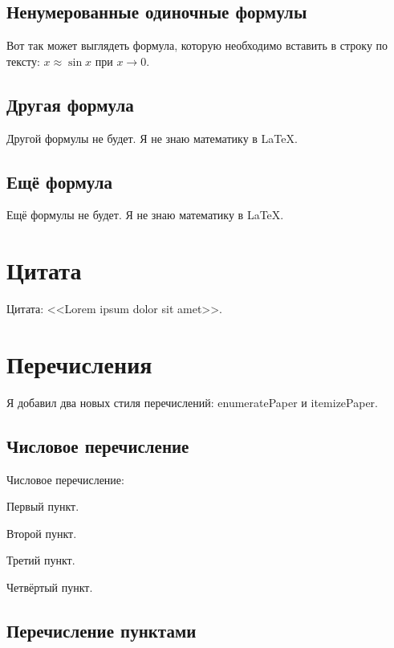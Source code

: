 \subsection{Ненумерованные одиночные формулы}\label{subsec:chapter_1/section_3/subsection_1}
Вот так может выглядеть формула, которую необходимо вставить в строку по тексту: \(x \approx \sin x\) при \(x \to 0\).

\subsection{Другая формула}\label{subsec:chapter_1/section_3/subsection_2}
Другой формулы не будет. Я не знаю математику в \LaTeX.

\subsection{Ещё формула}\label{subsec:chapter_1/section_3/subsection_3}
Ещё формулы не будет. Я не знаю математику в \LaTeX.

\section{Цитата}\label{sec:chapter_1/section_4}
Цитата: <<Lorem ipsum dolor sit amet>>.

\section{Перечисления}\label{sec:chapter_1/section_5}

Я добавил два новых стиля перечислений: enumeratePaper и itemizePaper.

\subsection{Числовое перечисление}\label{subsec:chapter_1/section_5/subsection_1}

Числовое перечисление:
\begin{enumeratePaper}
    \item Первый пункт.
    \item Второй пункт.
    \item Третий пункт.
    \item Четвёртый пункт.
\end{enumeratePaper}

\subsection{Перечисление пунктами}\label{subsec:chapter_1/section_5/subsection_2}

